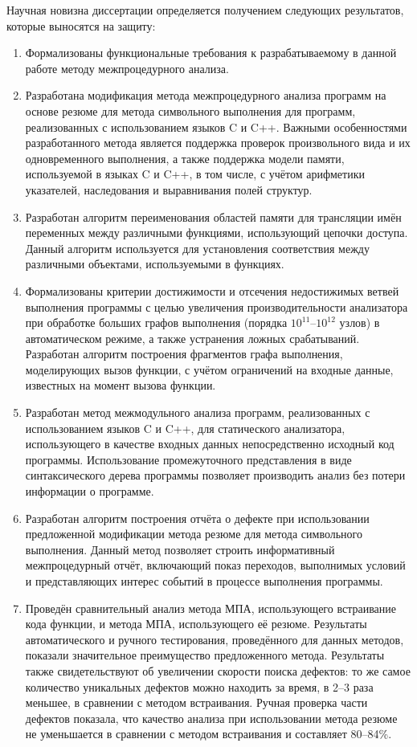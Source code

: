 \novelty

Научная новизна диссертации определяется получением следующих результатов, которые выносятся на защиту:
\begin{enumerate}[leftmargin=1em]
  \item Формализованы функциональные требования к разрабатываемому в данной работе методу межпроцедурного анализа.
  \item Разработана модификация метода межпроцедурного анализа программ на основе резюме для метода символьного выполнения для программ, реализованных с использованием языков C и C++. Важными особенностями разработанного метода является поддержка проверок произвольного вида и их одновременного выполнения, а также поддержка модели памяти, используемой в языках C и C++, в том числе, с учётом арифметики указателей, наследования и выравнивания полей структур.
  \item Разработан алгоритм переименования областей памяти для трансляции имён переменных между различными функциями, использующий цепочки доступа. Данный алгоритм используется для установления соответствия между различными объектами, используемыми в функциях.
  \item Формализованы критерии достижимости и отсечения недостижимых ветвей выполнения программы с целью увеличения производительности анализатора при обработке больших графов выполнения (порядка $10^{11}$--$10^{12}$ узлов) в автоматическом режиме, а также устранения ложных срабатываний. Разработан алгоритм построения фрагментов графа выполнения, моделирующих вызов функции, с учётом ограничений на входные данные, известных на момент вызова функции. 
  \item Разработан метод межмодульного анализа программ, реализованных с использованием языков C и C++, для статического анализатора, использующего в качестве входных данных непосредственно исходный код программы. Использование промежуточного представления в виде синтаксического дерева программы позволяет производить анализ без потери информации о программе.
  \item Разработан алгоритм построения отчёта о дефекте при использовании предложенной модификации метода резюме для метода символьного выполнения. Данный метод позволяет строить информативный межпроцедурный отчёт, включающий показ переходов, выполнимых условий и представляющих интерес событий в процессе выполнения программы.
  \item Проведён сравнительный анализ метода МПА, использующего встраивание кода функции, и метода МПА, использующего её резюме. Результаты автоматического и ручного тестирования, проведённого для данных методов, показали значительное преимущество предложенного метода. Результаты также свидетельствуют об увеличении скорости поиска дефектов: то же самое количество уникальных дефектов можно находить за время, в 2--3 раза меньшее, в сравнении с методом встраивания. Ручная проверка части дефектов показала, что качество анализа при использовании метода резюме не уменьшается в сравнении с методом встраивания и составляет 80--84\%.


\end{enumerate}

